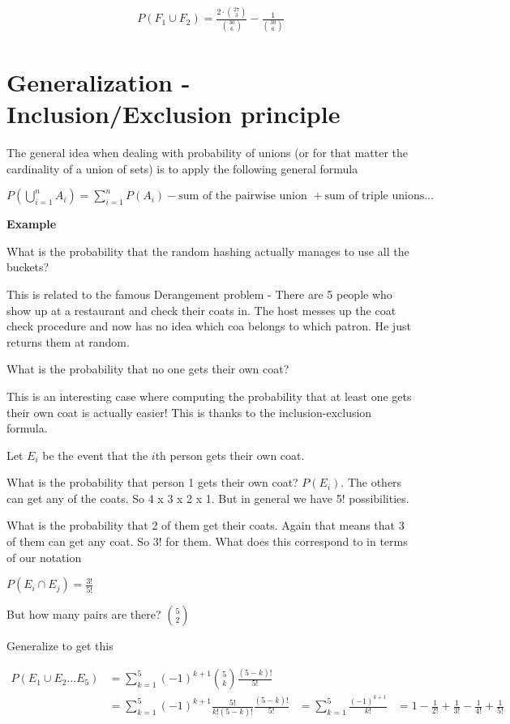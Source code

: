 \documentclass[12pt]{article}
\begin{document}
\begin{align*}
P(F_1 \cup F_2) = \frac{2 \cdot \binom{27}{3}}{\binom{30}{6}} - \frac{1}{\binom{30}{6}}
\end{align*}

\section*{Generalization - Inclusion/Exclusion principle}

The general idea when dealing with probability of unions (or for that matter the cardinality of a union of sets) is to apply the following general formula

$\displaystyle P(\bigcup_{i=1}^n A_i) = \sum_{i=1}^n P(A_i) - \text{sum of the pairwise union } + \text {sum of triple unions} ...$

\textbf{Example}

What is the probability that the random hashing actually manages to use all the buckets? 

This is related to the famous Derangement problem - There are 5 people who show up at a restaurant and check their coats in. The host messes up the coat check procedure and now has no idea which coa belongs to which patron. He just returns them at random.

What is the probability that no one gets their own coat?

This is an interesting case where computing the probability that at least one gets their own coat is actually easier! This is thanks to the inclusion-exclusion formula. 

Let $E_i$ be the event that the $i$th person gets their own coat. 

What is the probability that person 1 gets their own coat? $P(E_i)$. The others can get any of the coats. So 4 x 3 x 2 x 1. But in general we have 5! possibilities. 


What is the probability that 2 of them get their coats. Again that means that 3 of them can get any coat. So 3! for them. What does this correspond to in terms of our notation

$P(E_i \cap E_j) = \frac{3!}{5!}$

But how many pairs are there? $5 \choose 2$

Generalize to get this

\begin{align*}
P(E_1 \cup E_2 \ldots E_5) &= \sum_{k=1}^5 (-1)^{k+1}{5 \choose k} \frac{(5-k)!}{5!} \\
 &= \sum_{k=1}^5 (-1)^{k+1} \frac{5!}{k!(5-k)!}  \frac{(5-k)!}{5!}
 &= \sum_{k=1}^5 \frac{(-1)^{k+1} }{k!}
 &= 1 - \frac{1}{2!} + \frac{1}{3!} -\frac{1}{4!} + \frac{1}{5!}
\end{align*}
\end{document}
